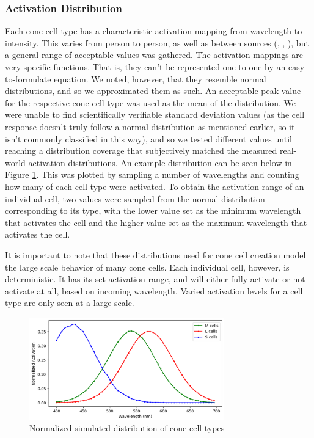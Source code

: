\documentclass[titlepage]{article}
\begin{document}
\subsubsection{Activation Distribution}

Each cone cell type has a characteristic activation mapping from wavelength to intensity. This varies from person to person, as well as between sources (\cite{conespectra}, \cite{colorperception}, \cite{coneinfo}), but a general range of acceptable values was gathered. The activation mappings are very specific functions. That is, they can't be represented one-to-one by an easy-to-formulate equation. We noted, however, that they resemble normal distributions, and so we approximated them as such. An acceptable peak value for the respective cone cell type was used as the mean of the distribution. We were unable to find scientifically verifiable standard deviation values (as the cell response doesn't truly follow a normal distribution as mentioned earlier, so it isn't commonly classified in this way), and so we tested different values until reaching a distribution coverage that subjectively matched the measured real-world activation distributions. An example distribution can be seen below in Figure \ref{fig:simulated_distribution}. This was plotted by sampling a number of wavelengths and counting how many of each cell type were activated. To obtain the activation range of an individual cell, two values were sampled from the normal distribution corresponding to its type, with the lower value set as the minimum wavelength that activates the cell and the higher value set as the maximum wavelength that activates the cell. 

\bigskip

It is important to note that these distributions used for cone cell creation model the large scale behavior of many cone cells. Each individual cell, however, is deterministic. It has its set activation range, and will either fully activate or not activate at all, based on incoming wavelength. Varied activation levels for a cell type are only seen at a large scale.

\begin{figure}[H]
    \centering
    \includegraphics[width=0.75\textwidth]{figs/simulated_distribution.png}
    \caption{Normalized simulated distribution of cone cell types}
    \label{fig:simulated_distribution}
\end{figure}
\end{document}
